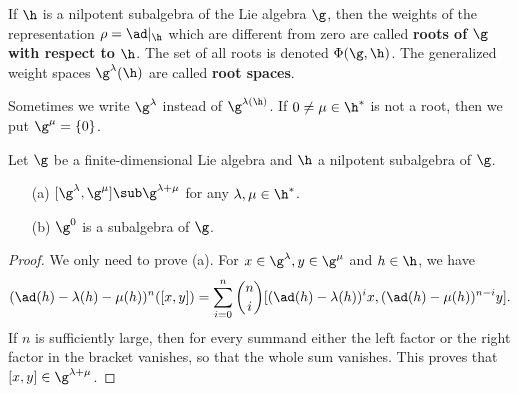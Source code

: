 \begin{definition}
If $\h$ is a nilpotent subalgebra of the Lie algebra $\g$, then the weights of the representation $\rho=\ad|_{\h}$ which are different from zero are called \textbf{roots of $\g$ with respect to $\h$}. The set of all roots is denoted $\Phi(\g,\h)$. The generalized weight spaces $\g^{\lambda}(\h)$ are called \textbf{root spaces}.
\end{definition}
Sometimes we write $\g^{\lambda}$ instead of $\g^{\lambda(\h)}$. If $0\neq\mu\in\h^*$ is not a root, then we put $\g^{\mu}=\{0\}$.
\begin{proposition}\label{Lie algebra root space prop}
Let $\g$ be a finite-dimensional Lie algebra and $\h$ a nilpotent subalgebra of $\g$.
\begin{itemize}
\item[(a)] $[\g^{\lambda},\g^{\mu}]\sub\g^{\lambda+\mu}$ for any $\lambda,\mu\in\h^*$.
\item[(b)] $\g^0$ is a subalgebra of $\g$.
\end{itemize}
\end{proposition}
\begin{proof}
We only need to prove (a). For $x\in\g^{\lambda},y\in\g^{\mu}$ and $h\in\h$, we have
\[(\ad(h)-\lambda(h)-\mu(h))^n([x,y])=\sum_{i=0}^{n}\binom{n}{i}[(\ad(h)-\lambda(h))^ix,(\ad(h)-\mu(h))^{n-i}y].\]
If $n$ is sufficiently large, then for every summand either the left factor or the right factor in the bracket vanishes, so that the whole sum vanishes. This proves that $[x,y]\in\g^{\lambda+\mu}$.
\end{proof}
